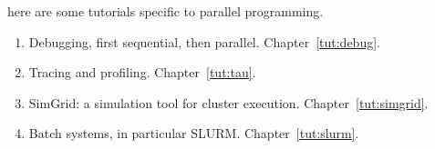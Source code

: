 here are some tutorials specific to parallel programming.
\begin{enumerate}
\item Debugging, first sequential, then parallel. Chapter~\ref{tut:debug}.
\item Tracing and profiling. Chapter~\ref{tut:tau}.
\item SimGrid: a simulation tool for cluster execution. Chapter~\ref{tut:simgrid}.
\item Batch systems, in particular \ac{SLURM}. Chapter~\ref{tut:slurm}.
\end{enumerate}
